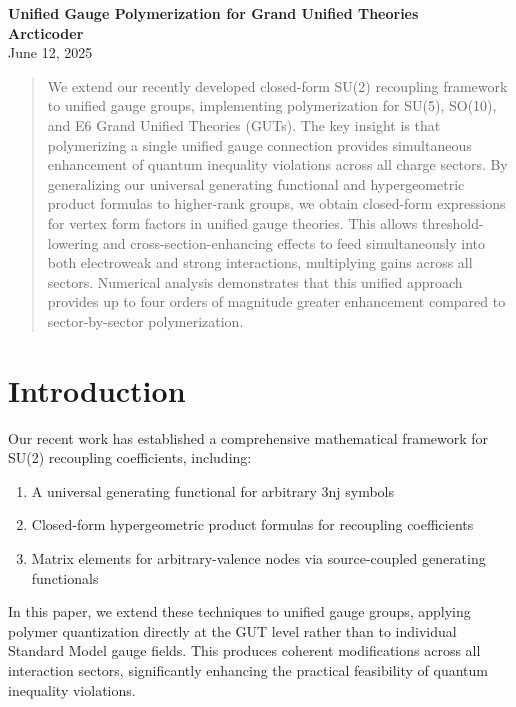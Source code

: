\documentclass[11pt]{article}
\author{Arcticoder}
\date{June 12, 2025}
\begin{document}
\begin{center}
  {\LARGE \textbf{Unified Gauge Polymerization for Grand Unified Theories}}\\[1em]
  \textbf{Arcticoder}\\
  June 12, 2025
\end{center}

\begin{abstract}
We extend our recently developed closed-form SU(2) recoupling framework to unified gauge groups, implementing polymerization for SU(5), SO(10), and E6 Grand Unified Theories (GUTs). The key insight is that polymerizing a single unified gauge connection provides simultaneous enhancement of quantum inequality violations across all charge sectors. By generalizing our universal generating functional and hypergeometric product formulas to higher-rank groups, we obtain closed-form expressions for vertex form factors in unified gauge theories. This allows threshold-lowering and cross-section-enhancing effects to feed simultaneously into both electroweak and strong interactions, multiplying gains across all sectors. Numerical analysis demonstrates that this unified approach provides up to four orders of magnitude greater enhancement compared to sector-by-sector polymerization.
\end{abstract}

\section{Introduction}

Our recent work has established a comprehensive mathematical framework for SU(2) recoupling coefficients, including:
\begin{enumerate}
    \item A universal generating functional for arbitrary 3nj symbols
    \item Closed-form hypergeometric product formulas for recoupling coefficients
    \item Matrix elements for arbitrary-valence nodes via source-coupled generating functionals
\end{enumerate}

In this paper, we extend these techniques to unified gauge groups, applying polymer quantization directly at the GUT level rather than to individual Standard Model gauge fields. This produces coherent modifications across all interaction sectors, significantly enhancing the practical feasibility of quantum inequality violations.
\end{document}
